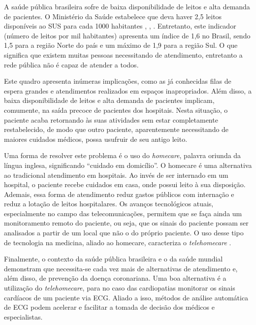 A saúde pública brasileira sofre de baixa disponibilidade de leitos e alta demanda de pacientes. O Ministério da Saúde estabelece que deva haver 2,5 leitos disponíveis ao SUS para cada 1000 habitantes \cite{IBGE2009}, \cite{IBGE2009}, \cite{Brasil2002}. Entretanto, este indicador (número de leitos por mil habitantes) apresenta um índice de 1,6 no Brasil, sendo 1,5 para a região Norte do país e um máximo de 1,9 para a região Sul. O que significa que existem muitas pessoas necessitando de atendimento, entretanto a rede pública não é capaz de atender a todos.

Este quadro apresenta inúmeras implicações, como as já conhecidas filas de espera grandes e atendimentos realizados em espaços inapropriados. Além disso, a baixa disponibilidade de leitos e alta demanda de pacientes implicam, comumente, na saída precoce de pacientes dos hospitais. Nesta situação, o paciente acaba retornando às suas atividades sem estar completamente restabelecido, de modo que outro paciente, aparentemente necessitando de maiores cuidados médicos, possa usufruir de seu antigo leito.

Uma forma de resolver este problema é o uso do \emph{homecare}, palavra oriunda da língua inglesa, significando ``cuidado em domicílio''. O homecare é uma alternativa ao tradicional atendimento em hospitais. Ao invés de ser internado em um hospital, o paciente recebe cuidados em casa, onde possui leito à sua disposição. Ademais, essa forma de atendimento reduz gastos públicos com internação e reduz a lotação de leitos hospitalares. Os avanços tecnológicos atuais, especialmente no campo das telecomunicações, permitem que se faça ainda um monitoramento remoto do paciente, ou seja, que os sinais do paciente possam ser analisados a partir de um local que não o do próprio paciente. O uso desse tipo de tecnologia na medicina, aliado ao homecare, caracteriza o \emph{telehomecare} \cite{Augustyniak2009}.

Finalmente, o contexto da saúde pública brasileira e o da saúde mundial demonstram que necessita-se cada vez mais de alternativas de atendimento e, além disso, de prevenção da doença coronariana. Uma boa alternativa é a utilização do \emph{telehomecare}, para no caso das cardiopatias monitorar os sinais cardíacos de um paciente via ECG. Aliado a isso, métodos de análise automática de ECG podem acelerar e facilitar a tomada de decisão dos médicos e especialistas.


